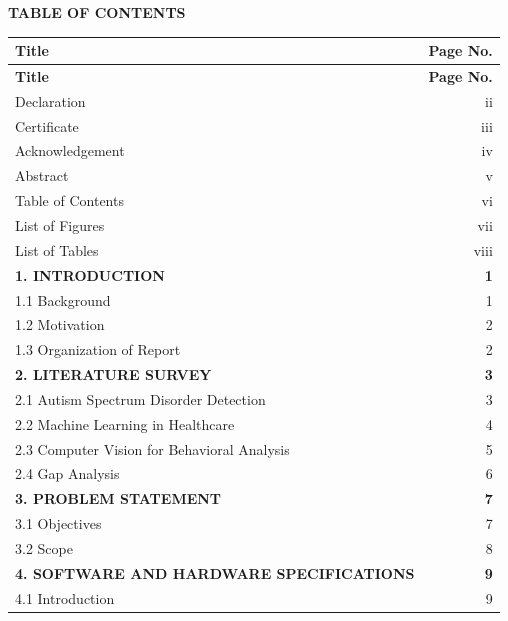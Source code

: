 \documentclass[12pt,letterpaper]{article}
\begin{document}
\thispagestyle{fancy}

\begin{center}
{\fontsize{14}{17}\selectfont\textbf{TABLE OF CONTENTS}}
\end{center}

\vspace{1cm}

\begin{longtable}{p{12cm}r}
\textbf{Title} & \textbf{Page No.} \\
\hline
\endfirsthead
\textbf{Title} & \textbf{Page No.} \\
\hline
\endhead
Declaration & ii \\
Certificate & iii \\
Acknowledgement & iv \\
Abstract & v \\
Table of Contents & vi \\
List of Figures & vii \\
List of Tables & viii \\
\textbf{1. INTRODUCTION} & \textbf{1} \\
\hspace{0.5cm}1.1 Background & 1 \\
\hspace{0.5cm}1.2 Motivation & 2 \\
\hspace{0.5cm}1.3 Organization of Report & 2 \\
\textbf{2. LITERATURE SURVEY} & \textbf{3} \\
\hspace{0.5cm}2.1 Autism Spectrum Disorder Detection & 3 \\
\hspace{0.5cm}2.2 Machine Learning in Healthcare & 4 \\
\hspace{0.5cm}2.3 Computer Vision for Behavioral Analysis & 5 \\
\hspace{0.5cm}2.4 Gap Analysis & 6 \\
\textbf{3. PROBLEM STATEMENT} & \textbf{7} \\
\hspace{0.5cm}3.1 Objectives & 7 \\
\hspace{0.5cm}3.2 Scope & 8 \\
\textbf{4. SOFTWARE AND HARDWARE SPECIFICATIONS} & \textbf{9} \\
\hspace{0.5cm}4.1 Introduction & 9 \\

\end{longtable}
\end{document}
